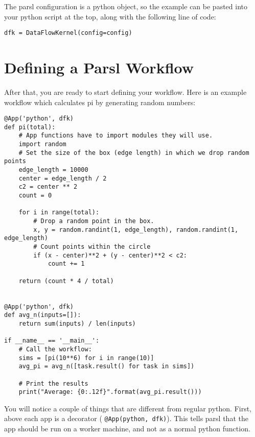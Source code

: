 \documentclass[]{book}
\theoremstyle{definition}
\theoremstyle{definition}
\theoremstyle{definition}
\theoremstyle{remark}
\begin{document}
The parsl configuration is a python object, so the example can be pasted
into your python script at the top, along with the following line of
code:

\begin{verbatim}
dfk = DataFlowKernel(config=config)
\end{verbatim}

\section{Defining a Parsl Workflow}\label{defining-a-parsl-workflow}

After that, you are ready to start defining your workflow. Here is an
example workflow which calculates pi by generating random numbers:

\begin{verbatim}
@App('python', dfk)
def pi(total):
    # App functions have to import modules they will use.                                            
    import random
    # Set the size of the box (edge length) in which we drop random points                           
    edge_length = 10000
    center = edge_length / 2
    c2 = center ** 2
    count = 0

    for i in range(total):
        # Drop a random point in the box.                                                            
        x, y = random.randint(1, edge_length), random.randint(1, edge_length)
        # Count points within the circle                                                             
        if (x - center)**2 + (y - center)**2 < c2:
            count += 1

    return (count * 4 / total)


@App('python', dfk)
def avg_n(inputs=[]):
    return sum(inputs) / len(inputs)

if __name__ == '__main__':
    # Call the workflow:                                                                                 
    sims = [pi(10**6) for i in range(10)]
    avg_pi = avg_n([task.result() for task in sims])

    # Print the results                                                                                  
    print("Average: {0:.12f}".format(avg_pi.result()))
\end{verbatim}

You will notice a couple of things that are different from regular
python. First, above each app is a decorator (
\texttt{@App(\textquotesingle{}python\textquotesingle{},\ dfk)}). This
tells parsl that the app should be run on a worker machine, and not as a
normal python function.
\end{document}
